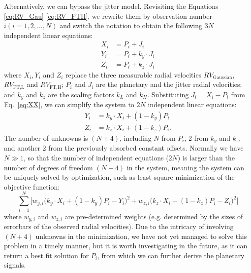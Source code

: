 Alternatively, we can bypass the jitter model. Revisiting the Equations \ref{eq:RV_Gau}-\ref{eq:RV_FTH}, we rewrite them by observation number $i (i=1,2,\ldots,N)$ and switch the notation to obtain the following $3N$ independent linear equations:
\begin{align}
	X_i 		&= P_i + J_i				\label{eq:XX} \\
	Y_i 		&= P_i + k_y \cdot J_i	\label{eq:YY} \\
	Z_i 		&= P_i + k_z \cdot J_i 	\label{eq:ZZ}
\end{align}
where $X_i, Y_i$ and $Z_i$ replace the three measurable radial velocities $RV_\text{Gaussian}$, $RV_\text{FT,L}$ and $RV_\text{FT,H}$; $P_i$ and $J_i$ are the planetary and the jitter radial velocities; and $k_y$ and $k_z$ are the scaling factors $k_L$ and $k_H$. Substituting $J_i = X_i - P_i$ from Eq.~\ref{eq:XX}, we can simplify the system to $2N$ independent linear equations:
\begin{align}
	Y_i 		&= k_y \cdot X_i + (1-k_y)P_i	\label{eq:YYY} \\
	Z_i 		&= k_z \cdot X_i + (1-k_z)P_i	\label{eq:ZZZ}.
\end{align}
The number of unknowns is $(N+4)$, including $N$ from $P_i$, 2 from $k_y$ and $k_z$, and another 2 from the previously absorbed constant offsets. Normally we have $N \gg 1$, so that the number of independent equations ($2N$) is larger than the number of degrees of freedom $(N+4)$ in the system, meaning the system can be uniquely solved by optimization, such as least square minimization of the objective function:
\begin{equation}
	\sum_{i=1}^{N} \Bigg[w_{y,i}\Big(k_y \cdot X_i + (1-k_y)P_i - Y_i \Big)^2 + w_{z,i}\Big(k_z \cdot X_i + (1-k_z)P_i- Z_i \Big)^2 \Bigg]
\label{eq:objective_function}
\end{equation}
where $w_{y,i}$ and $w_{z,i}$ are pre-determined weights (e.g. determined by the sizes of errorbars of the observed radial velocities). Due to the intricacy of involving $(N+4)$ unknowns in the minimization, we have not yet managed to solve this problem in a timely manner, but it is worth investigating in the future, as it can return a best fit solution for $P_i$, from which we can further derive the planetary signals. 


